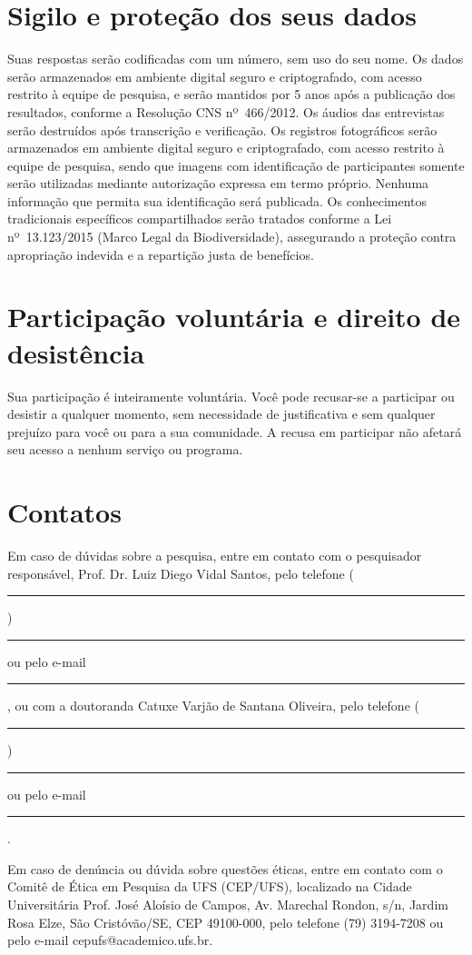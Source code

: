 \documentclass[12pt,a4paper,brazil]{article}
\begin{document}
\section*{Sigilo e proteção dos seus dados}

Suas respostas serão codificadas com um número, sem uso do seu nome. Os dados serão armazenados em ambiente digital seguro e criptografado, com acesso restrito à equipe de pesquisa, e serão mantidos por 5 anos após a publicação dos resultados, conforme a Resolução CNS nº~466/2012. Os áudios das entrevistas serão destruídos após transcrição e verificação. Os registros fotográficos serão armazenados em ambiente digital seguro e criptografado, com acesso restrito à equipe de pesquisa, sendo que imagens com identificação de participantes somente serão utilizadas mediante autorização expressa em termo próprio. Nenhuma informação que permita sua identificação será publicada. Os conhecimentos tradicionais específicos compartilhados serão tratados conforme a Lei nº~13.123/2015 (Marco Legal da Biodiversidade), assegurando a proteção contra apropriação indevida e a repartição justa de benefícios.

\section*{Participação voluntária e direito de desistência}

Sua participação é inteiramente voluntária. Você pode recusar-se a participar ou desistir a qualquer momento, sem necessidade de justificativa e sem qualquer prejuízo para você ou para a sua comunidade. A recusa em participar não afetará seu acesso a nenhum serviço ou programa.

\section*{Contatos}

Em caso de dúvidas sobre a pesquisa, entre em contato com o pesquisador responsável, Prof. Dr. Luiz Diego Vidal Santos, pelo telefone (\rule{1.5cm}{0.4pt}) \rule{3cm}{0.4pt} ou pelo e-mail \rule{5cm}{0.4pt}, ou com a doutoranda Catuxe Varjão de Santana Oliveira, pelo telefone (\rule{1.5cm}{0.4pt}) \rule{3cm}{0.4pt} ou pelo e-mail \rule{5cm}{0.4pt}.

Em caso de denúncia ou dúvida sobre questões éticas, entre em contato com o Comitê de Ética em Pesquisa da UFS (CEP/UFS), localizado na Cidade Universitária Prof. José Aloísio de Campos, Av. Marechal Rondon, s/n, Jardim Rosa Elze, São Cristóvão/SE, CEP 49100-000, pelo telefone (79) 3194-7208 ou pelo e-mail cepufs@academico.ufs.br.
\end{document}
